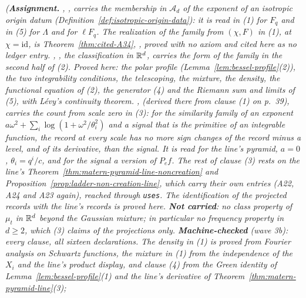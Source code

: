 \begin{theorem}[the \Matern{} pyramid in $\RR^d$]
\statusA\quad{}\quad{}\quad{}\quad\emph{(\textbf{Assignment.}
, , carries the membership in
$\mathcal{A}_d$ of the exponent of an isotropic origin datum (Definition~\ref{def:isotropic-origin-data}):
it is read in (1) for $F_q$ and in (5) for $\Lambda$ and for $\ell F_q$. The realization of the
family from $(\chi, F)$ in (1), at $\chi = \mathrm{id}$, is Theorem~\ref{thm:cited-A34},
, proved with no axiom and cited here as no ledger entry. , , the classification in
$\RR^d$, carries the form of the family in the second half of (2). Proved here: the polar profile
(Lemma~\ref{lem:bessel-profile}(2)), the two integrability conditions, the telescoping, the mixture,
the density, the functional equation of (2), the generator (4) and the Riemann sum and limits of
(5), with Lévy's continuity theorem. , 
(derived there from clause (1) on p.~39), carries the count from scale zero in (3): for the
similarity family of an exponent $a\omega^2 + \sum_i\log(1 + \omega^2/\theta_i^2)$ and a signal that is
the primitive of an integrable function, the record at every scale has no more sign changes of
the record minus a level, and of its derivative, than the signal. It is read for the line's
pyramid, $a = 0$, $\theta_i = q^i/c$, and for the signal a version of $P_ef$. The rest of clause (3) rests on the line's
Theorem~\ref{thm:matern-pyramid-line-noncreation} and Proposition~\ref{prop:ladder-non-creation-line},
which carry their own entries (A22, A24 and A23 again), reached through \texttt{uses}. The
identification of the projected records with the line's records is proved here.
\textbf{Not carried}: no class property of $\mu_t$ in $\RR^d$ beyond the Gaussian mixture; in
particular no \Polya{} frequency property in $d \ge 2$, which (3) claims of the projections only.
\textbf{Machine-checked} (wave 3b): every clause, all sixteen declarations. The density in (1) is
proved from Fourier analysis on Schwartz functions, the mixture in (1) from the independence of
the $X_i$ and the line's product display, and clause (4) from the Green identity of
Lemma~\ref{lem:bessel-profile}(1) and the line's derivative of Theorem~\ref{thm:matern-pyramid-line}(3);
}
\end{theorem}
